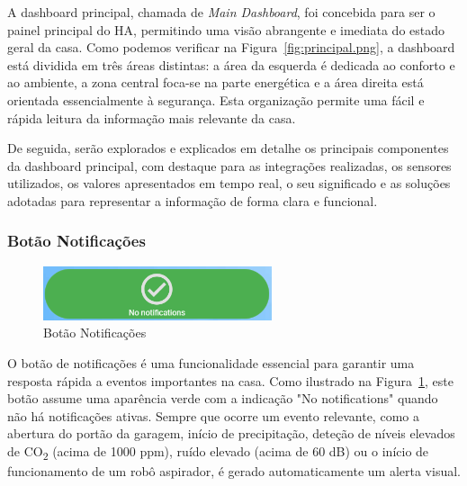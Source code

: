A dashboard principal, chamada de \textit{Main Dashboard}, foi concebida para ser o painel principal do \gls{HA}, permitindo uma visão abrangente e imediata do estado geral da casa. Como podemos verificar na Figura~\ref{fig:principal.png}, a dashboard está dividida em três áreas distintas: a área da esquerda é dedicada ao conforto e ao ambiente, a zona central foca-se na parte energética e a área direita está orientada essencialmente à segurança. Esta organização permite uma fácil e rápida leitura da informação mais relevante da casa.

De seguida, serão explorados e explicados em detalhe os principais componentes da dashboard principal, com destaque para as integrações realizadas, os sensores utilizados, os valores apresentados em tempo real, o seu significado e as soluções adotadas para representar a informação de forma clara e funcional.




\subsubsection{Botão Notificações}

\begin{figure}[H]
    \centering
    \includegraphics[width=0.6\textwidth]{images/botao_notificacoes.png}
    \caption{Botão Notificações}
    \label{fig:botao_notificacoes.png}
\end{figure}

O botão de notificações é uma funcionalidade essencial para garantir uma resposta rápida a eventos importantes na casa. Como ilustrado na Figura~\ref{fig:botao_notificacoes.png}, este botão assume uma aparência verde com a indicação \textnormal{"No notifications"} quando não há notificações ativas. Sempre que ocorre um evento relevante, como a abertura do portão da garagem, início de precipitação, deteção de níveis elevados de CO\textsubscript{2} (acima de 1000 ppm), ruído elevado (acima de 60 dB) ou o início de funcionamento de um robô aspirador, é gerado automaticamente um alerta visual.


